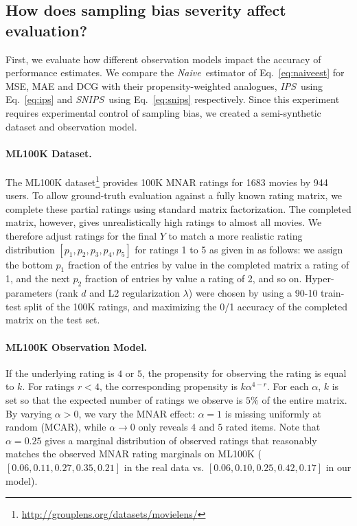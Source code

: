 \documentclass{article}
\newcommand{\ytrue}{Y}                      %
\newcommand{\naive}{\emph{Naive}}
\newcommand{\ips}{\emph{IPS}}               %
\newcommand{\snips}{\emph{SNIPS}}
\begin{document}
\subsection{How does sampling bias severity affect evaluation?} \label{sec:expbiaseval}
First, we evaluate how different observation models impact the accuracy of performance estimates.
We compare the \naive\ estimator of Eq.~\eqref{eq:naiveest} for MSE, MAE and DCG with their propensity-weighted analogues, \ips\ using Eq.~\eqref{eq:ips} and \snips\  using Eq.~\eqref{eq:snips} respectively. Since this experiment requires experimental control of sampling bias, we created a semi-synthetic dataset and observation model.
\vspace{-3mm}
\paragraph{ML100K Dataset.} The ML100K dataset\footnote{\href{http://grouplens.org/datasets/movielens/}{http://grouplens.org/datasets/movielens/}} provides 100K MNAR ratings for 1683 movies by 944 users. To allow ground-truth evaluation against a fully known rating matrix, we complete these partial ratings using standard matrix factorization.
The completed matrix, however, gives unrealistically high ratings to almost all movies. We therefore adjust ratings for the final $\ytrue$ to match a more realistic rating distribution $\left[p_1, p_2, p_3, p_4, p_5 \right]$ for ratings 1 to 5 as given in \citet{Marlin/Zemel/09} as follows:  we assign the bottom $p_1$ fraction of the entries by value in the completed matrix a rating of 1, and the next $p_2$ fraction of entries by value a rating of 2, and so on.
Hyper-parameters (rank $d$ and L2 regularization $\lambda$) were chosen by using a 90-10 train-test split of the 100K ratings, and maximizing the 0/1 accuracy
of the completed matrix on the test set.
\vspace{-3mm}
\paragraph{ML100K Observation Model.} 
If the underlying rating is $4$ or $5$, the propensity for observing the rating is equal to $k$. For ratings $r < 4$, the corresponding propensity is $k \alpha^{4-r}$. For each $\alpha$, $k$ is set so that the expected number of ratings we observe is $5\%$ of the entire matrix.
By varying $\alpha > 0$, we vary the MNAR effect: $\alpha = 1$ is missing uniformly at random (MCAR), while $\alpha \rightarrow 0$ only reveals $4$ and $5$ rated items.
Note that $\alpha = 0.25$ gives a marginal distribution of observed ratings that reasonably matches the observed MNAR rating marginals on ML100K ($\left[ 0.06, 0.11, 0.27, 0.35,  0.21 \right]$ in the real data vs. $\left[ 0.06,  0.10,  0.25,  0.42,  0.17 \right]$ in our model).
\vspace{-3mm}
\end{document}
